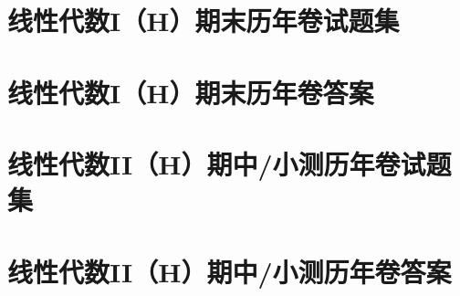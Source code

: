 \documentclass[
    geometry = 16k,
]{LALUbook}
\begin{document}
\chapter{线性代数I（H）期末历年卷试题集}














\chapter{线性代数I（H）期末历年卷答案}













\chapter{线性代数II（H）期中/小测历年卷试题集}









\chapter{线性代数II（H）期中/小测历年卷答案}








\end{document}
